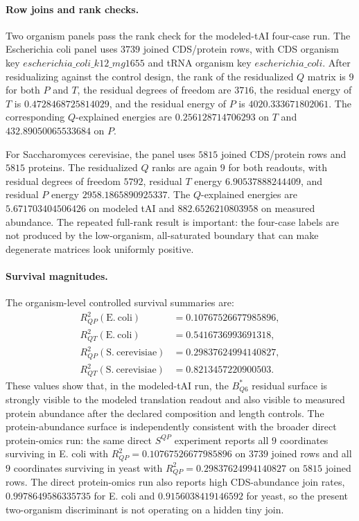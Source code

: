 \paragraph{Row joins and rank checks.}
Two organism panels pass the rank check for the modeled-tAI four-case run.  The Escherichia coli panel uses $3739$ joined CDS/protein rows, with CDS organism key $escherichia\_coli\_k12\_mg1655$ and tRNA organism key $escherichia\_coli$.  After residualizing against the control design, the rank of the residualized $Q$ matrix is $9$ for both $P$ and $T$, the residual degrees of freedom are $3716$, the residual energy of $T$ is $0.4728468725814029$, and the residual energy of $P$ is $4020.333671802061$.  The corresponding $Q$-explained energies are $0.256128714706293$ on $T$ and $432.89050065533684$ on $P$.

For Saccharomyces cerevisiae, the panel uses $5815$ joined CDS/protein rows and $5815$ proteins.  The residualized $Q$ ranks are again $9$ for both readouts, with residual degrees of freedom $5792$, residual $T$ energy $6.90537888244409$, and residual $P$ energy $2958.1865890925337$.  The $Q$-explained energies are $5.671703404506426$ on modeled tAI and $882.6526210803958$ on measured abundance.  The repeated full-rank result is important: the four-case labels are not produced by the low-organism, all-saturated boundary that can make degenerate matrices look uniformly positive.

\paragraph{Survival magnitudes.}
The organism-level controlled survival summaries are:
$$
\begin{aligned}
R^2_{QP}(\mathrm{E.\ coli}) &= 0.10767526677985896,\\
R^2_{QT}(\mathrm{E.\ coli}) &= 0.5416736993691318,\\
R^2_{QP}(\mathrm{S.\ cerevisiae}) &= 0.29837624994140827,\\
R^2_{QT}(\mathrm{S.\ cerevisiae}) &= 0.8213457220900503.
\end{aligned}
$$
These values show that, in the modeled-tAI run, the $B^{*}_{Q6}$ residual surface is strongly visible to the modeled translation readout and also visible to measured protein abundance after the declared composition and length controls.  The protein-abundance surface is independently consistent with the broader direct protein-omics run: the same direct $S^{QP}$ experiment reports all $9$ coordinates surviving in E. coli with $R^2_{QP}=0.10767526677985896$ on $3739$ joined rows and all $9$ coordinates surviving in yeast with $R^2_{QP}=0.29837624994140827$ on $5815$ joined rows.  The direct protein-omics run also reports high CDS-abundance join rates, $0.9978649586335735$ for E. coli and $0.9156038419146592$ for yeast, so the present two-organism discriminant is not operating on a hidden tiny join.

